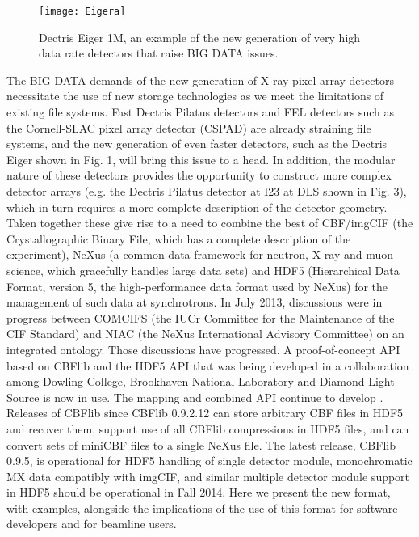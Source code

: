 \documentclass[11pt]{a0poster}
\begin{document}
\begin{minipage}[]{0.29\linewidth}
\begin{figure}
\begin{center}
\vspace{-20 mm}
\texttt{[image: Eigera]}
\vspace{-20 mm}
\caption{\fontsize{16}{20}\selectfont %
Dectris Eiger 1M, an example of the new generation
of very high data rate detectors that raise BIG DATA
issues.
}
\label{fig:eiger}
\end{center}
\end{figure}
The BIG DATA demands of the new generation of X-ray pixel array detectors
necessitate the use of new storage technologies as we meet the limitations of
existing file systems. Fast Dectris Pilatus detectors and FEL detectors such as
the Cornell-SLAC pixel array detector (CSPAD) are already straining
file systems, and the new generation of even faster detectors, such as the Dectris Eiger
shown in Fig. 1,
will bring this issue to a head. In addition, the modular
nature of these detectors provides the opportunity
to construct more complex detector arrays (e.g. the
Dectris Pilatus detector at I23 at DLS shown in Fig. 3), which in
turn requires a more complete description of the
detector geometry. Taken together these give rise
to a need to combine the best of CBF/imgCIF (the
Crystallographic Binary File, which has a complete
description of the experiment), NeXus (a common
data framework for neutron, X-ray and muon
science, which gracefully handles large data sets)
and HDF5 (Hierarchical Data Format, version 5, the high-performance data format
used by NeXus) for the management of such data at synchrotrons. In July 2013,
discussions were in progress between COMCIFS (the IUCr Committee for the
Maintenance of the CIF Standard) and NIAC (the NeXus International Advisory
Committee) on an integrated ontology. Those discussions have progressed. A
proof-of-concept API based on CBFlib and the HDF5 API that was being
developed in a collaboration among Dowling College, Brookhaven National
Laboratory and Diamond Light Source is now in use. The mapping and combined
API continue to develop \cite{bernstein2014}.   Releases of CBFlib since CBFlib 0.9.2.12 can store arbitrary CBF
files in HDF5 and recover them, support use of all CBFlib compressions in HDF5
files, and can convert sets of miniCBF files to a single NeXus file.  The latest
release, CBFlib 0.9.5, is operational for HDF5 handling of single detector module, monochromatic MX data compatibly with imgCIF, and similar multiple detector 
module support in HDF5 should be operational in Fall 2014.  Here we present
the new format, with examples, alongside the implications of the use of this format
for software developers and for beamline users.


\end{minipage}
\end{document}
